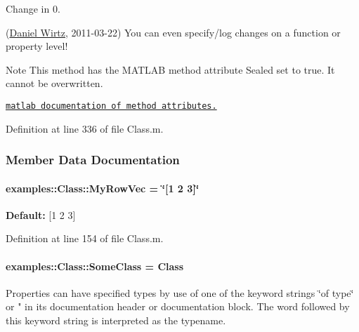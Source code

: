 \begin{DoxyRefDesc}{Change in 0.}
\item[\hyperlink{changelog0_1__changelog0_1000001}{Change in 0.\+1}](\hyperlink{developers_dw}{Daniel Wirtz}, 2011-\/03-\/22) You can even specify/log changes on a function or property level!\end{DoxyRefDesc}


\begin{DoxyNote}{Note}
This method has the M\+A\+T\+L\+A\+B method attribute {\ttfamily Sealed} set to true. It cannot be overwritten. 

\href{http://www.mathworks.com/help/matlab/matlab_oop/method-attributes.html}{\tt matlab documentation of method attributes.} 
\end{DoxyNote}


Definition at line 336 of file Class.\+m.



\subsubsection{Member Data Documentation}
\hypertarget{classexamples_1_1_class_ab85289c174b6911551b1523f0ba8392e}{}
\paragraph[{My\+Row\+Vec}]{\setlength{\rightskip}{0pt plus 5cm}examples\+::\+Class\+::\+My\+Row\+Vec = \char`\"{}\mbox{[}1 2 3\mbox{]}\char`\"{}}\label{classexamples_1_1_class_ab85289c174b6911551b1523f0ba8392e}
{\bfseries Default\+:} \mbox{[}1 2 3\mbox{]} 

Definition at line 154 of file Class.\+m.

\hypertarget{classexamples_1_1_class_aed917135d06017b35cf176628fbc780c}{}
\paragraph[{Some\+Class}]{\setlength{\rightskip}{0pt plus 5cm}examples\+::\+Class\+::\+Some\+Class = {\bf Class}}\label{classexamples_1_1_class_aed917135d06017b35cf176628fbc780c}
Properties can have specified types by use of one of the keyword strings \char`\"{}of type\char`\"{} or " in its documentation header or documentation block. The word followed by this keyword string is interpreted as the typename.

